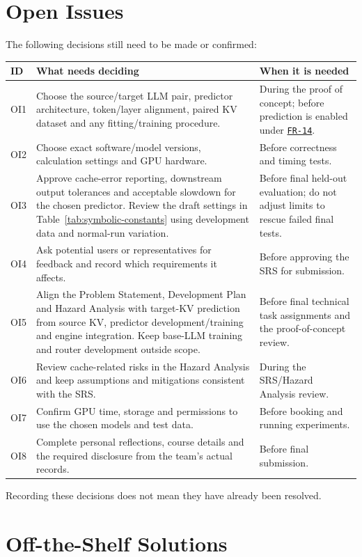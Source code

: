 \documentclass[12pt]{article}
\begin{document}
\section{Open Issues}
\label{sec:open}
The following decisions still need to be made or confirmed:
\begin{longtable}{@{}p{}p{}p{}@{}}
\toprule ID & What needs deciding & When it is needed\\\midrule\endhead
OI1 & Choose the source/target LLM pair, predictor architecture, token/layer alignment, paired KV dataset and any fitting/training procedure. & During the proof of concept; before prediction is enabled under \hyperref[req:FR-14]{\texttt{FR-14}}.\\
OI2 & Choose exact software/model versions, calculation settings and GPU hardware. & Before correctness and timing tests.\\
OI3 & Approve cache-error reporting, downstream output tolerances and acceptable slowdown for the chosen predictor. Review the draft settings in Table~\ref{tab:symbolic-constants} using development data and normal-run variation. & Before final held-out evaluation; do not adjust limits to rescue failed final tests.\\
OI4 & Ask potential users or representatives for feedback and record which requirements it affects. & Before approving the SRS for submission.\\
OI5 & Align the Problem Statement, Development Plan and Hazard Analysis with target-KV prediction from source KV, predictor development/training and engine integration. Keep base-LLM training and router development outside scope. & Before final technical task assignments and the proof-of-concept review.\\
OI6 & Review cache-related risks in the Hazard Analysis and keep assumptions and mitigations consistent with the SRS. & During the SRS/Hazard Analysis review.\\
OI7 & Confirm GPU time, storage and permissions to use the chosen models and test data. & Before booking and running experiments.\\
OI8 & Complete personal reflections, course details and the required disclosure from the team's actual records. & Before final submission.\\
\bottomrule
\end{longtable}
Recording these decisions does not mean they have already been resolved.

\section{Off-the-Shelf Solutions}
\end{document}
